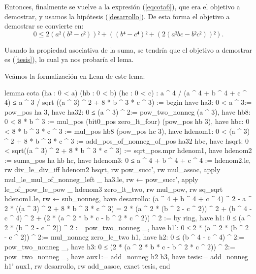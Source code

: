 \begin{demostracion}
  Entonces, finalmente se vuelve a la expresión (\ref{eqcota6}), que era
  el objetivo a demostrar, y usamos la hipótesis (\ref{desarrollo}). De
  esta forma el objetivo a demostrar se convierte en:
  \begin{equation}
    0≤2(a²(b²-c²))²+((b⁴-c⁴)²+(2(a²bc-b²c²))²).
  \end{equation}

  Usando la propiedad asociativa de la suma, se tendría que el objetivo a
  demostrar es (\ref{tesis}), lo cual ya nos probaría el lema.
\end{demostracion}

Veámos la formalización en Lean de este lema:

\begin{leancode}
lemma cota (ha : 0 < a) (hb : 0 < b) (hc : 0 < c) :
  a ^ 4 / (a ^ 4 + b ^ 4 + c ^ 4) ≤
  a ^ 3 / sqrt ((a ^ 3) ^ 2 + 8 * b ^ 3 * c ^ 3) :=
begin
  have ha3: 0 < a ^ 3:= pow_pos ha 3,
  have ha32: 0 ≤  (a ^ 3) ^ 2:= pow_two_nonneg (a ^ 3),
  have hb8: 0 < 8 * b ^ 3 := mul_pos (bit0_pos zero_lt_four) (pow_pos hb 3),
  have hbc: 0 < 8 * b ^ 3 * c ^ 3 := mul_pos hb8 (pow_pos hc 3),
  have hdenom1: 0 < (a ^ 3) ^ 2 + 8 * b ^ 3 * c ^ 3 := 
    add_pos_of_nonneg_of_pos ha32 hbc,
  have hsqrt: 0 < sqrt((a ^ 3) ^ 2 + 8 * b ^ 3 * c ^ 3) := 
    sqrt_pos.mpr hdenom1,
  have hdenom2 := suma_pos ha hb hc,
  have hdenom3: 0 ≤ a ^ 4 + b ^ 4 + c ^ 4 := hdenom2.le,
  rw div_le_div_iff hdenom2 hsqrt,
  rw pow_succ',
  rw mul_assoc,
  apply mul_le_mul_of_nonneg_left _ ha3.le,
  rw ← pow_succ',
  apply le_of_pow_le_pow _ hdenom3 zero_lt_two,
  rw mul_pow,
  rw sq_sqrt hdenom1.le,
  rw ← sub_nonneg,
  have desarrollo: (a ^ 4 + b ^ 4 + c ^ 4) ^ 2 - 
      a ^ 2 * ((a ^ 3) ^ 2 + 8 * b ^ 3 * c ^ 3)
      = 2 * (a ^ 2 * (b ^ 2 - c ^ 2)) ^ 2 + (b ^ 4 - c ^ 4) ^ 2 +
      (2 * (a ^ 2 * b * c - b ^ 2 * c ^ 2)) ^ 2 := by ring,
  have h1: 0 ≤ (a ^ 2 * (b ^ 2 - c ^ 2)) ^ 2 := pow_two_nonneg _,
  have h1': 0 ≤ 2 * (a ^ 2 * (b ^ 2 - c ^ 2)) ^ 2:= 
    mul_nonneg zero_le_two h1,
  have h2: 0 ≤ (b ^ 4 - c ^ 4) ^ 2:= pow_two_nonneg _,
  have h3: 0 ≤ (2 * (a ^ 2 * b * c - b ^ 2 * c ^ 2)) ^ 2:= 
    pow_two_nonneg _,
  have aux1:= add_nonneg h2 h3,
  have tesis:= add_nonneg h1' aux1,
  rw desarrollo,
  rw add_assoc,
  exact tesis,
end
\end{leancode}


